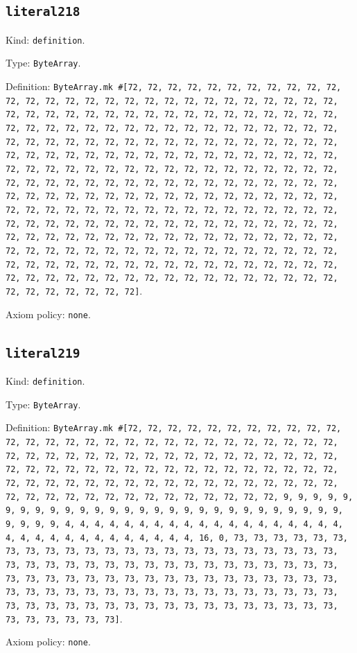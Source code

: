 \documentclass[11pt]{article}
\begin{document}
\subsection*{\texttt{literal218}}
\noindent Kind: \texttt{definition}.\par
\noindent Type: \texttt{ByteArray}.\par
\noindent Definition: \texttt{ByteArray.mk \#[72, 72, 72, 72, 72, 72, 72, 72, 72, 72, 72, 72, 72, 72, 72, 72, 72, 72, 72, 72, 72, 72, 72, 72, 72, 72, 72, 72, 72, 72, 72, 72, 72, 72, 72, 72, 72, 72, 72, 72, 72, 72, 72, 72, 72, 72, 72, 72, 72, 72, 72, 72, 72, 72, 72, 72, 72, 72, 72, 72, 72, 72, 72, 72, 72, 72, 72, 72, 72, 72, 72, 72, 72, 72, 72, 72, 72, 72, 72, 72, 72, 72, 72, 72, 72, 72, 72, 72, 72, 72, 72, 72, 72, 72, 72, 72, 72, 72, 72, 72, 72, 72, 72, 72, 72, 72, 72, 72, 72, 72, 72, 72, 72, 72, 72, 72, 72, 72, 72, 72, 72, 72, 72, 72, 72, 72, 72, 72, 72, 72, 72, 72, 72, 72, 72, 72, 72, 72, 72, 72, 72, 72, 72, 72, 72, 72, 72, 72, 72, 72, 72, 72, 72, 72, 72, 72, 72, 72, 72, 72, 72, 72, 72, 72, 72, 72, 72, 72, 72, 72, 72, 72, 72, 72, 72, 72, 72, 72, 72, 72, 72, 72, 72, 72, 72, 72, 72, 72, 72, 72, 72, 72, 72, 72, 72, 72, 72, 72, 72, 72, 72, 72, 72, 72, 72, 72, 72, 72, 72, 72, 72, 72, 72, 72, 72, 72, 72, 72, 72, 72, 72, 72, 72, 72, 72, 72, 72, 72, 72, 72, 72, 72, 72, 72, 72, 72, 72, 72, 72, 72, 72, 72, 72, 72, 72, 72, 72, 72, 72, 72, 72, 72, 72, 72, 72, 72]}.\par
\noindent Axiom policy: \texttt{none}.\par
\subsection*{\texttt{literal219}}
\noindent Kind: \texttt{definition}.\par
\noindent Type: \texttt{ByteArray}.\par
\noindent Definition: \texttt{ByteArray.mk \#[72, 72, 72, 72, 72, 72, 72, 72, 72, 72, 72, 72, 72, 72, 72, 72, 72, 72, 72, 72, 72, 72, 72, 72, 72, 72, 72, 72, 72, 72, 72, 72, 72, 72, 72, 72, 72, 72, 72, 72, 72, 72, 72, 72, 72, 72, 72, 72, 72, 72, 72, 72, 72, 72, 72, 72, 72, 72, 72, 72, 72, 72, 72, 72, 72, 72, 72, 72, 72, 72, 72, 72, 72, 72, 72, 72, 72, 72, 72, 72, 72, 72, 72, 72, 72, 72, 72, 72, 72, 72, 72, 72, 72, 9, 9, 9, 9, 9, 9, 9, 9, 9, 9, 9, 9, 9, 9, 9, 9, 9, 9, 9, 9, 9, 9, 9, 9, 9, 9, 9, 9, 9, 9, 9, 9, 4, 4, 4, 4, 4, 4, 4, 4, 4, 4, 4, 4, 4, 4, 4, 4, 4, 4, 4, 4, 4, 4, 4, 4, 4, 4, 4, 4, 4, 4, 4, 4, 16, 0, 73, 73, 73, 73, 73, 73, 73, 73, 73, 73, 73, 73, 73, 73, 73, 73, 73, 73, 73, 73, 73, 73, 73, 73, 73, 73, 73, 73, 73, 73, 73, 73, 73, 73, 73, 73, 73, 73, 73, 73, 73, 73, 73, 73, 73, 73, 73, 73, 73, 73, 73, 73, 73, 73, 73, 73, 73, 73, 73, 73, 73, 73, 73, 73, 73, 73, 73, 73, 73, 73, 73, 73, 73, 73, 73, 73, 73, 73, 73, 73, 73, 73, 73, 73, 73, 73, 73, 73, 73, 73, 73, 73, 73, 73, 73, 73, 73]}.\par
\noindent Axiom policy: \texttt{none}.\par
\end{document}
